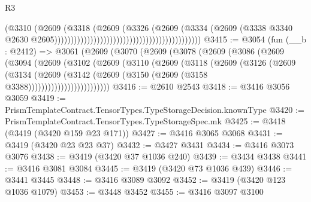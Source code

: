 \begin{lexlean}{R3}
\begin{coremodule}
                                                                            (@3310
                                                                              (@2609
                                                                                (@3318
                                                                                  (@2609
                                                                                    (@3326
                                                                                      (@2609
                                                                                        (@3334
                                                                                          (@2609
                                                                                            (@3338
                                                                                              @3340
                                                                                              @2630
                                                                                              @2605)))))))))))))))))))))))))))))))))))))))))))))
@3415 := @3054
    (fun (__b : @2412) =>
    @3061
      (@2609
        (@3070
          (@2609
            (@3078
              (@2609
                (@3086
                  (@2609
                    (@3094
                      (@2609
                        (@3102
                          (@2609
                            (@3110
                              (@2609
                                (@3118
                                  (@2609
                                    (@3126
                                      (@2609
                                        (@3134
                                          (@2609
                                            (@3142
                                              (@2609
                                                (@3150 (@2609 (@3158 @3388)))))))))))))))))))))))))
@3416 := @2610 @2543
@3418 := @3416 @3056 @3059
@3419 := PrismTemplateContract.TensorTypes.TypeStorageDecision.knownType
@3420 := PrismTemplateContract.TensorTypes.TypeStorageSpec.mk
@3425 := @3418 (@3419 (@3420 @159 @23 @171))
@3427 := @3416 @3065 @3068
@3431 := @3419 (@3420 @23 @23 @37)
@3432 := @3427 @3431
@3434 := @3416 @3073 @3076
@3438 := @3419 (@3420 @37 @1036 @240)
@3439 := @3434 @3438
@3441 := @3416 @3081 @3084
@3445 := @3419 (@3420 @73 @1036 @439)
@3446 := @3441 @3445
@3448 := @3416 @3089 @3092
@3452 := @3419 (@3420 @123 @1036 @1079)
@3453 := @3448 @3452
@3455 := @3416 @3097 @3100

\end{coremodule}
\end{lexlean}
